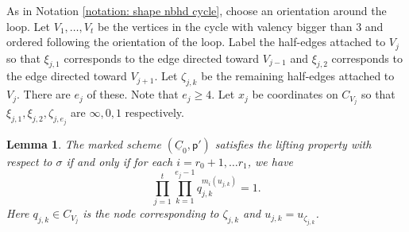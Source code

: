 \documentclass{article}
\newtheorem{lemma}[definition]{Lemma}
\begin{document}
As in Notation \ref{notation: shape nbhd cycle}, choose an orientation around the loop. Let $V_1,\ldots, V_t$ be the vertices in the cycle with valency bigger than $3$ and ordered following the orientation of the loop. Label the half-edges attached to $V_j$ so that $\xi_{j,1}$ corresponds to the edge directed toward $V_{j-1}$ and $\xi_{j,2}$ corresponds to the edge directed toward $V_{j+1}$. Let $\zeta_{j,k}$ be the remaining half-edges attached to $V_j$. There are $e_j$ of these. Note that $e_j \geq 4$. Let $x_j$ be coordinates on $C_{V_j}$ so that $\xi_{j,1}, \xi_{j,2}, \zeta_{j, e_j}$ are $\infty, 0, 1$ respectively. 

\begin{lemma}\label{lemma: lifting_property_equation}
    The marked scheme $(\underline{C}_0, \mathsf{p}')$ satisfies the lifting property with respect to $\sigma$ if and only if for each $i = r_0 +1, \ldots r_1$, we have
    \begin{equation} \label{eqn: big product}
        \prod_{j = 1}^t \prod_{k=1}^{e_j -1} q_{j,k}^{m_i(u_{j,k})} = 1.
    \end{equation}
    Here $q_{j,k} \in C_{V_j}$ is the node corresponding to $\zeta_{j,k}$ and $u_{j,k}=u_{\zeta_{j,k}}$.
\end{lemma}
\end{document}
